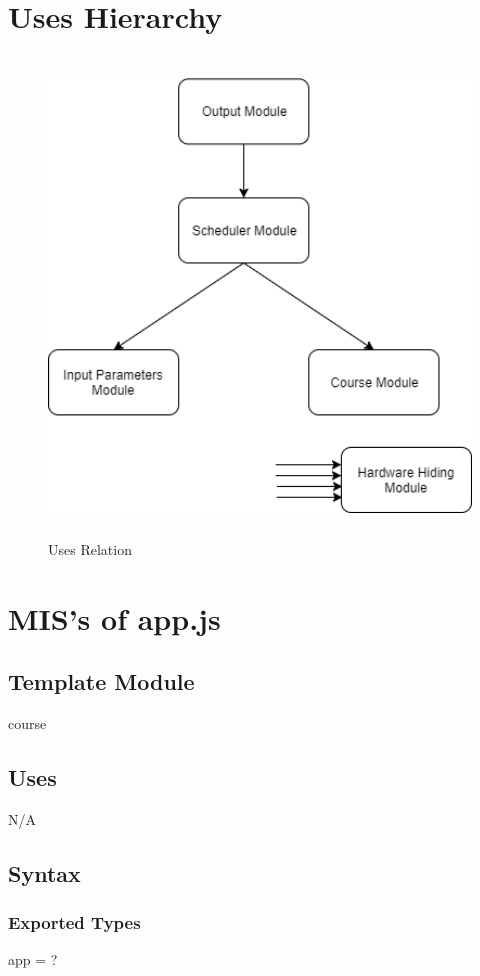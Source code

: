 \documentclass[11pt, oneside]{article}
\begin{document}
\newpage
\section{Uses Hierarchy}

\begin{figure}[h]
    \centering
    \includegraphics[height=127mm]{../Attachments/UsesRelation.png}
    \caption{Uses Relation}
    \label{fig:my_label}
\end{figure}


\newpage

\section{MIS's of app.js}
\subsection*{Template Module}
course
\subsection* {Uses}
N/A
\subsection* {Syntax}
\subsubsection* {Exported Types}
app = ?
\end{document}
